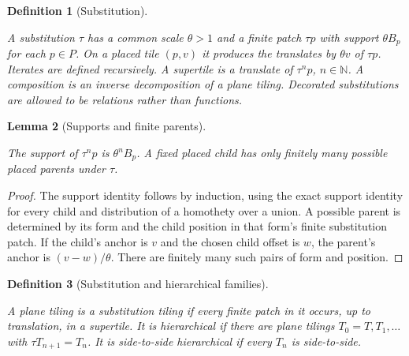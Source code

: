 \documentclass[11pt,a4paper]{article}
\newcommand{\N}{\mathbb N}
\newtheorem{definition}{Definition}[section]
\newtheorem{lemma}[definition]{Lemma}
\theoremstyle{remark}
\newcommand{\lean}[1]{}
\newcommand{\uses}[1]{}
\begin{document}
\begin{definition}[Substitution]\label{def:substitution}
\lean{Tilings.Substitution}
\uses{def:placed}
A substitution $\tau$ has a common scale $\theta>1$ and a finite patch
$\tau p$ with support $\theta B_p$ for each $p\in P$. On a placed tile
$(p,v)$ it produces the translates by $\theta v$ of $\tau p$.
Iterates are defined recursively. A supertile is a translate of $\tau^n p$,
$n\in\N$. A composition is an inverse decomposition of a plane tiling.
Decorated substitutions are allowed to be relations rather than functions.
\end{definition}

\begin{lemma}[Supports and finite parents]\label{lem:finiteparents}
\lean{Tilings.Substitution.iterate_support,Tilings.Substitution.finite_parents}
\uses{def:substitution}
The support of $\tau^n p$ is $\theta^n B_p$. A fixed placed child has only
finitely many possible placed parents under $\tau$.
\end{lemma}
\begin{proof}
The support identity follows by induction, using the exact support identity
for every child and distribution of a homothety over a union.
A possible parent is determined by its form and the child position in that
form's finite substitution patch. If the child's anchor is $v$ and the
chosen child offset is $w$, the parent's anchor is $(v-w)/\theta$.
There are finitely many such pairs of form and position.
\end{proof}

\begin{definition}[Substitution and hierarchical families]\label{def:hierarchy}
\lean{Tilings.IsSubstitutionTiling,Tilings.IsHierarchical,Tilings.IsSideToSideHierarchical}
\uses{def:tiling,def:substitution}
A plane tiling is a substitution tiling if every finite patch in it occurs,
up to translation, in a supertile. It is hierarchical if there are plane
tilings $T_0=T,T_1,\ldots$ with $\tau T_{n+1}=T_n$.
It is side-to-side hierarchical if every $T_n$ is side-to-side.
\end{definition}
\end{document}
